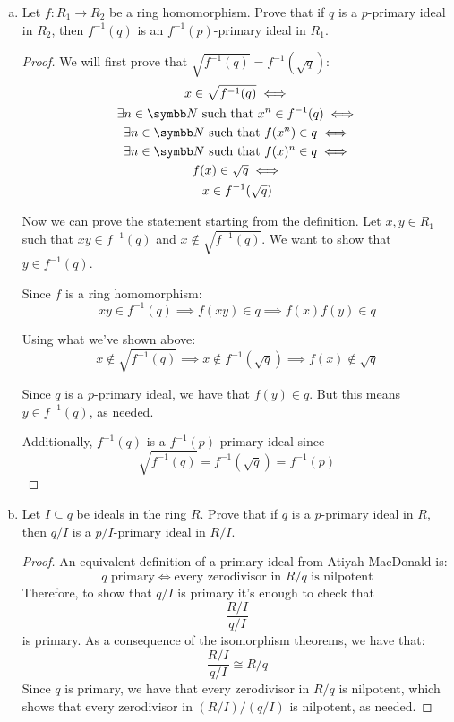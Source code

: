 \begin{problem*}{6}
\begin{enumerate}[(a)]
    \item Let \(f \colon R_1 \to R_2\) be a ring homomorphism. Prove that if \(q\) is a \(p\)-primary ideal in \(R_2\), then \(f^{-1} (q)\) is an \(f^{-1} (p)\)-primary ideal in \(R_1\).
    
    \begin{proof}
    We will first prove that \(\sqrt{f^{-1}(q)} = f^{-1}(\sqrt{q})\):
    \begin{gather*}
        x \in \sqrt{f^{-1}(q)} \iff \\
        \exists n \in \naturals \text{ such that } x^n \in f^{-1}(q) \iff \\
        \exists n \in \naturals \text{ such that } f(x^n) \in q \iff \\
        \exists n \in \naturals \text{ such that } f(x)^n \in q \iff \\
        f(x) \in \sqrt{q} \iff \\
        x \in f^{-1}(\sqrt{q})
    \end{gather*}
    
    Now we can prove the statement starting from the definition. Let \(x, y \in R_1\) such that \(x y \in f^{-1}(q)\) and \(x \not\in \sqrt{f^{-1}(q)}\). We want to show that \(y \in f^{-1}(q)\).
    
    Since \(f\) is a ring homomorphism:
    \[
        x y \in f^{-1}(q) \implies f(x y) \in q \implies f(x) f(y) \in q
    \]

    Using what we've shown above:
    \[x \not\in \sqrt{f^{-1}(q)} \implies x \not\in f^{-1}(\sqrt{q}) \implies f(x) \not\in \sqrt{q}\]
    
    Since \(q\) is a \(p\)-primary ideal, we have that \(f(y) \in q\). But this means \(y \in f^{-1}(q)\), as needed.
    
    Additionally, \(f^{-1}(q)\) is a \(f^{-1}(p)\)-primary ideal since 
    \[
        \sqrt{f^{-1}(q)} = f^{-1}(\sqrt{q}) = f^{-1}(p)
    \]
    \end{proof}
    
    \item Let \(I \subseteq q\) be ideals in the ring \(R\). Prove that if \(q\) is a \(p\)-primary ideal in \(R\), then \(q/I\) is a \(p/I\)-primary ideal in \(R/I\).
    \begin{proof}
    An equivalent definition of a primary ideal from Atiyah-MacDonald is:
    \[
        q \text{ primary} \iff \text{every zerodivisor in } R/q \text{ is nilpotent}
    \]
    Therefore, to show that \(q/I\) is primary it's enough to check that
    \[
        \frac{R/I}{q/I}
    \]
    is primary. As a consequence of the isomorphism theorems, we have that:
    \[
        \frac{R/I}{q/I} \cong R/q
    \]
    Since \(q\) is primary, we have that every zerodivisor in \(R/q\) is nilpotent, which shows that every zerodivisor in \((R/I)/(q/I)\) is nilpotent, as needed.
    

\end{proof}
\end{enumerate}
\end{problem*}

